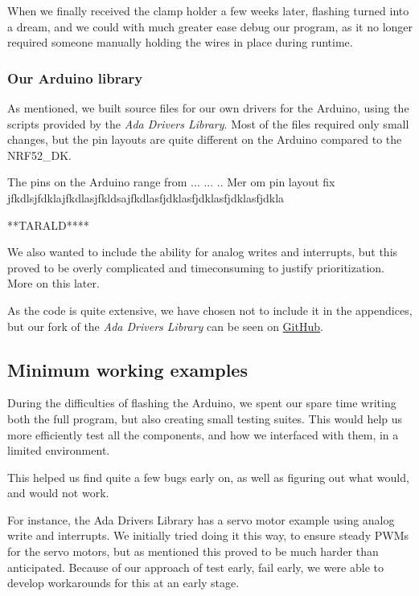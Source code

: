 \documentclass{article}
\begin{document}
When we finally received the clamp holder a few weeks later, flashing turned into a dream, and we could with much greater ease debug our program, as it no longer required someone manually holding the wires in place during runtime. 


\subsubsection{Our Arduino library}

As mentioned, we built source files for our own drivers for the Arduino, using the scripts provided by the \textit{Ada Drivers Library}. Most of the files required only small changes, but the pin layouts are quite different on the Arduino compared to the NRF52\_DK. 

The pins on the Arduino range from ... ... .. Mer om pin layout fix jfkdlsjfdklajfkdlasjfkldsajfkdlasfjdklasfjdklasfjdklasfjdkla

**TARALD****

We also wanted to include the ability for analog writes and interrupts, but this proved to be overly complicated and timeconsuming to justify prioritization. More on this later. 

As the code is quite extensive, we have chosen not to include it in the appendices, but our fork of the \textit{Ada Drivers Library} can be seen on \href{https://github.com/Stykk-Gruppen/Ada_Drivers_Library}{GitHub}.

\subsection{Minimum working examples}

During the difficulties of flashing the Arduino, we spent our spare time writing both the full program, but also creating small testing suites. This would help us more efficiently test all the components, and how we interfaced with them, in a limited environment. 

This helped us find quite a few bugs early on, as well as figuring out what would, and would not work.

For instance, the Ada Drivers Library has a servo motor example using analog write and interrupts. We initially tried doing it this way, to ensure steady PWMs for the servo motors, but as mentioned this proved to be much harder than anticipated. Because of our approach of test early, fail early, we were able to develop workarounds for this at an early stage.\\ 
\end{document}
